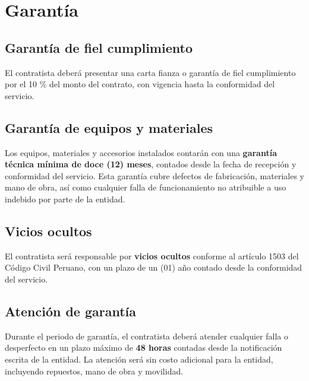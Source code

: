 \documentclass[12pt,a4paper]{article}
\begin{document}
\section{Garantía}

\subsection{Garantía de fiel cumplimiento}

El contratista deberá presentar una carta fianza o garantía de fiel cumplimiento por el 10 \% del monto del contrato, con vigencia hasta la conformidad del servicio.

\subsection{Garantía de equipos y materiales}

Los equipos, materiales y accesorios instalados contarán con una \textbf{garantía técnica mínima de doce (12) meses}, contados desde la fecha de recepción y conformidad del servicio. Esta garantía cubre defectos de fabricación, materiales y mano de obra, así como cualquier falla de funcionamiento no atribuible a uso indebido por parte de la entidad.

\subsection{Vicios ocultos}

El contratista será responsable por \textbf{vicios ocultos} conforme al artículo 1503 del Código Civil Peruano, con un plazo de un (01) año contado desde la conformidad del servicio.

\subsection{Atención de garantía}

Durante el periodo de garantía, el contratista deberá atender cualquier falla o desperfecto en un plazo máximo de \textbf{48 horas} contadas desde la notificación escrita de la entidad. La atención será sin costo adicional para la entidad, incluyendo repuestos, mano de obra y movilidad.

\end{document}
